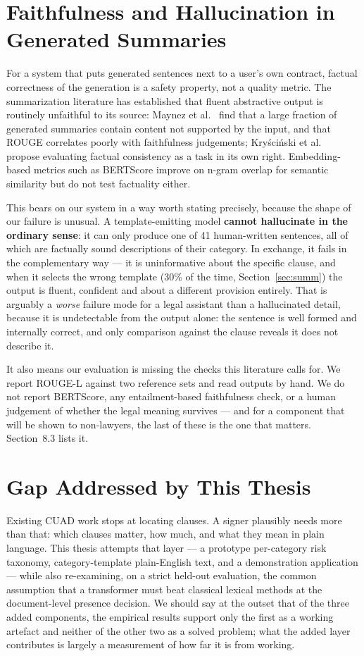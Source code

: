 \section{Faithfulness and Hallucination in Generated Summaries}
\label{sec:lit_faith}
For a system that puts generated sentences next to a user's own contract, factual correctness of the generation is a safety property, not a quality metric. The summarization literature has established that fluent abstractive output is routinely unfaithful to its source: Maynez et al.\ \cite{maynez2020faithfulness} find that a large fraction of generated summaries contain content not supported by the input, and that ROUGE correlates poorly with faithfulness judgements; Kry\'{s}ci\'{n}ski et al.\ \cite{kryscinski2020factcc} propose evaluating factual consistency as a task in its own right. Embedding-based metrics such as BERTScore \cite{zhang2020bertscore} improve on n-gram overlap for semantic similarity but do not test factuality either.

This bears on our system in a way worth stating precisely, because the shape of our failure is unusual. A template-emitting model \textbf{cannot hallucinate in the ordinary sense}: it can only produce one of 41 human-written sentences, all of which are factually sound descriptions of their category. In exchange, it fails in the complementary way --- it is uninformative about the specific clause, and when it selects the wrong template (30\% of the time, Section~\ref{sec:summ}) the output is fluent, confident and about a different provision entirely. That is arguably a \emph{worse} failure mode for a legal assistant than a hallucinated detail, because it is undetectable from the output alone: the sentence is well formed and internally correct, and only comparison against the clause reveals it does not describe it.

It also means our evaluation is missing the checks this literature calls for. We report ROUGE-L against two reference sets and read outputs by hand. We do not report BERTScore, any entailment-based faithfulness check, or a human judgement of whether the legal meaning survives --- and for a component that will be shown to non-lawyers, the last of these is the one that matters. Section~8.3 lists it.

\section{Gap Addressed by This Thesis}
Existing CUAD work stops at locating clauses. A signer plausibly needs more than that: which clauses matter, how much, and what they mean in plain language. This thesis attempts that layer --- a prototype per-category risk taxonomy, category-template plain-English text, and a demonstration application --- while also re-examining, on a strict held-out evaluation, the common assumption that a transformer must beat classical lexical methods at the document-level presence decision. We should say at the outset that of the three added components, the empirical results support only the first as a working artefact and neither of the other two as a solved problem; what the added layer contributes is largely a measurement of how far it is from working.

